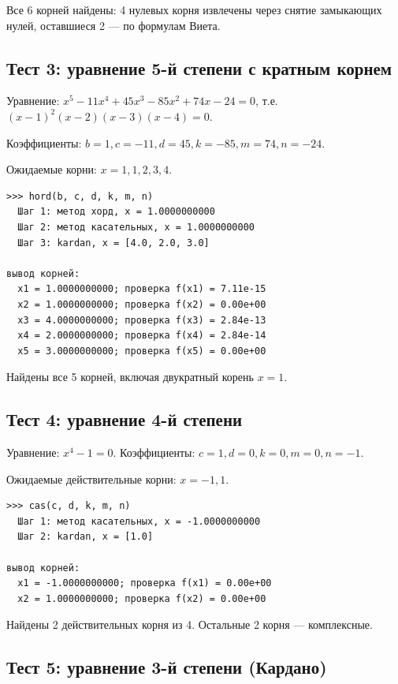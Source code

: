 \documentclass[a4paper,14pt]{extarticle}
\begin{document}
Все 6 корней найдены: 4 нулевых корня извлечены через снятие замыкающих нулей, оставшиеся 2 --- по формулам Виета.

\subsection*{Тест 3: уравнение 5-й степени с кратным корнем}

Уравнение: $x^5 - 11x^4 + 45x^3 - 85x^2 + 74x - 24 = 0$, т.е. $(x-1)^2(x-2)(x-3)(x-4) = 0$.

Коэффициенты: $b=1, c=-11, d=45, k=-85, m=74, n=-24$.

Ожидаемые корни: $x = 1, 1, 2, 3, 4$.

\begin{Verbatim}[frame=single,fontsize=\footnotesize]
>>> hord(b, c, d, k, m, n)
  Шаг 1: метод хорд, x = 1.0000000000
  Шаг 2: метод касательных, x = 1.0000000000
  Шаг 3: kardan, x = [4.0, 2.0, 3.0]

вывод корней:
  x1 = 1.0000000000; проверка f(x1) = 7.11e-15
  x2 = 1.0000000000; проверка f(x2) = 0.00e+00
  x3 = 4.0000000000; проверка f(x3) = 2.84e-13
  x4 = 2.0000000000; проверка f(x4) = 2.84e-14
  x5 = 3.0000000000; проверка f(x5) = 0.00e+00
\end{Verbatim}

Найдены все 5 корней, включая двукратный корень $x = 1$.

\subsection*{Тест 4: уравнение 4-й степени}

Уравнение: $x^4 - 1 = 0$. Коэффициенты: $c=1, d=0, k=0, m=0, n=-1$.

Ожидаемые действительные корни: $x = -1, 1$.

\begin{Verbatim}[frame=single,fontsize=\footnotesize]
>>> cas(c, d, k, m, n)
  Шаг 1: метод касательных, x = -1.0000000000
  Шаг 2: kardan, x = [1.0]

вывод корней:
  x1 = -1.0000000000; проверка f(x1) = 0.00e+00
  x2 = 1.0000000000; проверка f(x2) = 0.00e+00
\end{Verbatim}

Найдены 2 действительных корня из 4. Остальные 2 корня --- комплексные.

\subsection*{Тест 5: уравнение 3-й степени (Кардано)}
\end{document}
